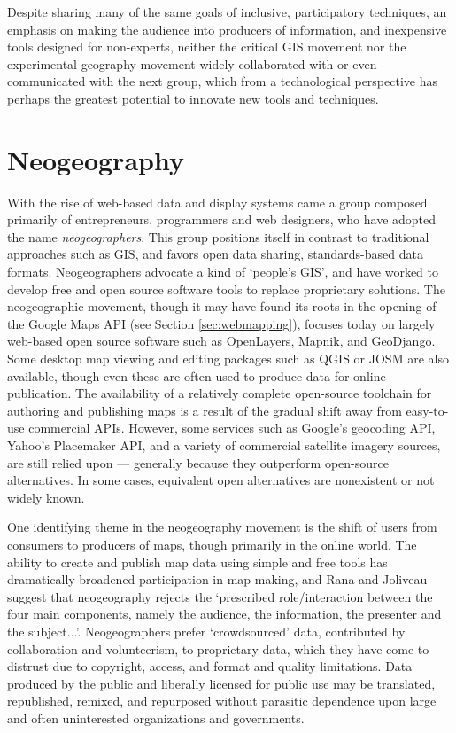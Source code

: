 \documentclass[11pt,oneside,notitlepage]{report}
\begin{document}
{{Despite sharing many of the same goals of inclusive, participatory techniques, an emphasis on making the audience into producers of information, and inexpensive tools designed for non-experts, neither the critical GIS movement nor the experimental geography movement widely collaborated with or even communicated with the next group, which from a technological perspective has perhaps the greatest potential to innovate new tools and techniques. 

\section{Neogeography}
\label{sec:neogeography}

With the rise of web-based data and display systems came a group composed primarily of entrepreneurs, programmers and web designers, who have adopted the name \emph{neogeographers}. This group positions itself in contrast to traditional approaches such as GIS, and favors open data sharing, standards-based data formats. Neogeographers advocate a kind of `people's GIS', and have worked to develop free and open source software tools to replace proprietary solutions. The neogeographic movement, though it may have found its roots in the opening of the Google Maps \ac{API} (see Section \ref{sec:webmapping}), focuses today on largely web-based open source software such as OpenLayers, Mapnik, and GeoDjango. Some desktop map viewing and editing packages such as QGIS or \ac{JOSM} are also available, though even these are often used to produce data for online publication. The availability of a relatively complete open-source toolchain for authoring and publishing maps is a result of the gradual shift away from easy-to-use commercial \ac{API}s. \cite{rana2009neogeography} However, some services such as Google's geocoding \ac{API}, Yahoo's Placemaker \ac{API}, and a variety of commercial satellite imagery sources, are still relied upon --- generally because they outperform open-source alternatives. In some cases, equivalent open alternatives are nonexistent or not widely known.

One identifying theme in the neogeography movement is the shift of users from consumers to producers of maps, though primarily in the online world. \cite{oconnor2008maps} The ability to create and publish map data using simple and free tools has dramatically broadened participation in map making, and Rana and Joliveau suggest that neogeography rejects the `prescribed role/interaction between the four main components, namely the audience, the information, the presenter and the subject...'. \cite{rana2009neogeography} Neogeographers prefer `crowdsourced' data, contributed by collaboration and volunteerism, to proprietary data, which they have come to distrust due to copyright, access, and format and quality limitations. Data produced by the public and liberally licensed for public use may be translated, republished, remixed, and repurposed without parasitic dependence upon large and often uninterested organizations and governments. 

}}
\end{document}
